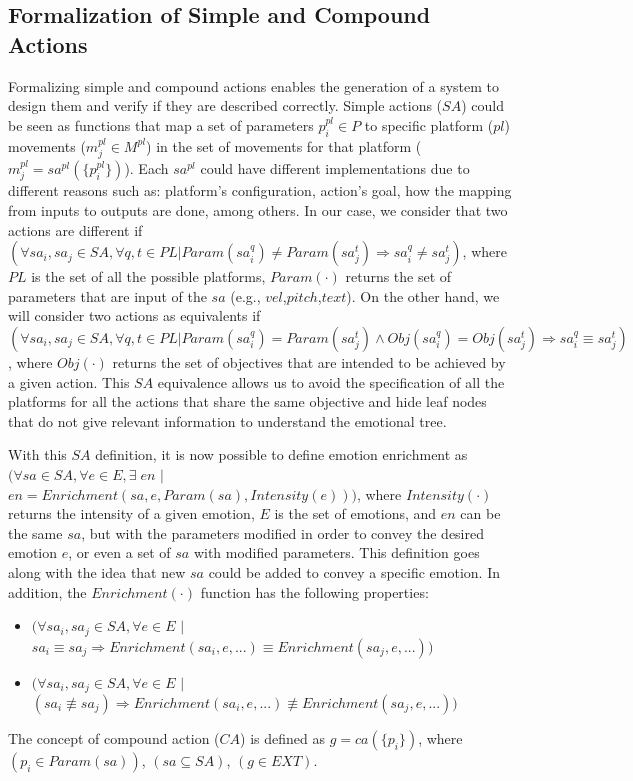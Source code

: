 \subsection{Formalization of Simple and Compound Actions}
Formalizing simple and compound actions enables the generation of a system to design them and verify if they are described correctly. Simple actions ($SA$) could be seen as functions that map a set of parameters $p^{pl}_{i} \in P$ to specific platform ($pl$) movements ($m^{pl}_{j}\in M^{pl}$) in the set of movements for that platform ($m^{pl}_{j} =sa^{pl}(\lbrace p^{pl}_{i} \rbrace)$). Each $sa^{pl}$ could have different implementations due to different reasons such as: platform's configuration, action's goal, how the mapping from inputs to outputs are done, among others. 
In our case, we consider that two actions are different if $(\forall sa_{i}, sa_{j} \in SA, \forall q, t \in PL | Param( sa_{i}^q ) \neq Param( sa_{j}^t )\Rightarrow sa_{i}^q \neq sa_{j}^t)$, 
where $PL$ is the set of all the possible platforms, $Param(\cdot)$ returns the set of parameters that are input of the $sa$ (e.g., $vel$,$pitch$,$text$). 
On the other hand, we will consider two actions as equivalents if $(\forall sa_{i}, sa_{j} \in SA , \forall q, t \in PL | Param( sa_{i}^q ) = Param(sa_{j}^t ) \wedge Obj(sa_{i}^q) = Obj(sa_{j}^t) \Rightarrow sa_{i}^q \equiv sa_{j}^t)$,  
where $Obj(\cdot)$ returns the set of objectives that are intended to be achieved by a given action. This $SA$ equivalence allows us to avoid the specification of all the platforms for all the actions that share the same objective and hide leaf nodes that do not give relevant information to understand the emotional tree.

With this $SA$ definition, it is now possible to define emotion enrichment as $ (\forall sa \in SA, \forall e \in E, \exists \; en$ $|$ $en=Enrichment(sa,e,Param(sa), Intensity(e)))$, where $Intensity(\cdot)$ returns the intensity of a given emotion, $E$ is the set of emotions, and $en$ can be the same $sa$, but with the parameters modified in order to convey the desired emotion $e$, or even a set of $sa$ with modified parameters. This definition goes along with the idea that new $sa$ could be added to convey a specific emotion. In addition, the $Enrichment(\cdot)$ function has the following properties:
\begin{itemize}
	\item $(\forall sa_{i},sa_{j} \in SA, \forall e \in E$ $|$ $sa_{i} \equiv sa_{j} \Rightarrow Enrichment(sa_{i},e,...) \equiv Enrichment(sa_{j},e,...))$
	\item $(\forall sa_{i},sa_{j} \in SA, \forall e \in E$ $|$ $(sa_{i} \not\equiv sa_{j}) \Rightarrow Enrichment(sa_{i},e,...) \not \equiv Enrichment(sa_{j},e,...))$
\end{itemize}

The concept of compound action ($CA$) is defined as $g = ca(\{p_{i}\})$, where $(p_{i} \in Param(sa))$, $(sa \subseteq SA)$, $(g \in EXT)$.

